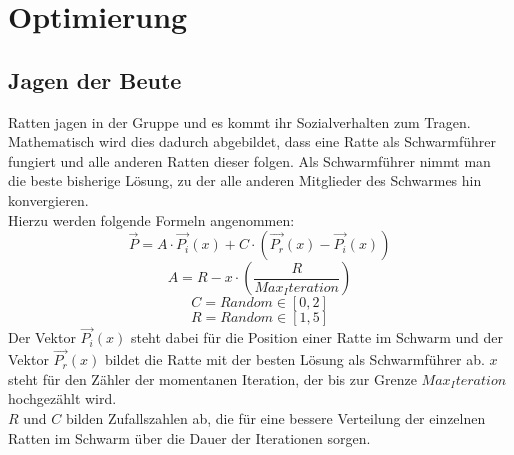 \chapter{Optimierung}
\section{Jagen der Beute}
Ratten jagen in der Gruppe und es kommt ihr Sozialverhalten zum Tragen. Mathematisch wird dies dadurch abgebildet, dass eine Ratte als Schwarmführer fungiert und alle anderen Ratten dieser folgen. Als Schwarmführer nimmt man die beste bisherige Lösung, zu der alle anderen Mitglieder des Schwarmes hin konvergieren. \\
Hierzu werden folgende Formeln angenommen: 
\begin{equation}
    \vec{P} = A \cdot \vec{P_i}(x) + C \cdot (\vec{P_r}(x) - \vec{P_i}(x))
    \label{calcP}
\end{equation}
\begin{equation}
    A = R-x \cdot (\frac{R}{Max_Iteration})
    \label{calcA}
\end{equation}
\begin{equation}
    C = Random \in [0,2]
    \label{calcC}
\end{equation}
\begin{equation}
    R = Random \in [1,5]
    \label{calcR}
\end{equation}
Der Vektor $\vec{P_i}(x)$ steht dabei für die Position einer Ratte im Schwarm und der Vektor $\vec{P_r}(x)$ bildet die Ratte mit der besten Lösung als Schwarmführer ab. $x$ steht für den Zähler der momentanen Iteration, der bis zur Grenze $Max_Iteration$ hochgezählt wird. \\
$R$ und $C$ bilden Zufallszahlen ab, die für eine bessere Verteilung der einzelnen Ratten im Schwarm über die Dauer der Iterationen sorgen.

